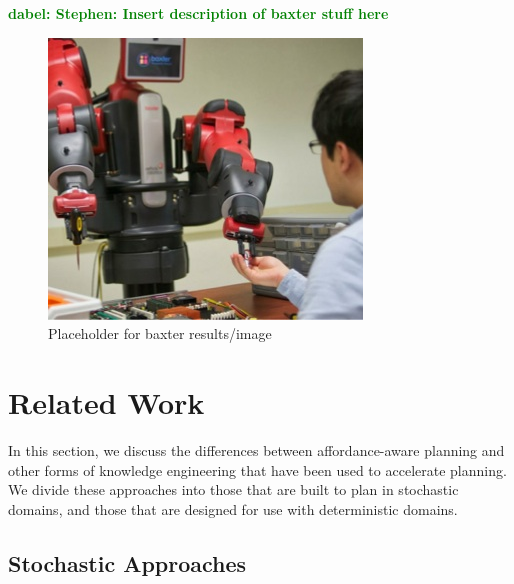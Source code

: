 \documentclass[letterpaper]{article}
\newcommand{\dnote}[1]{\textcolor{Green}{\textbf{dabel:  #1}}}
\begin{document}
\dnote{Stephen: Insert description of baxter stuff here}

\begin{figure}[H]
\centering
\includegraphics[scale=0.195]{figures/baxter_temp.jpg}%
  \caption{Placeholder for baxter results/image}
  \label{fig:baxter_results}
\end{figure}

\section{Related Work}
\label{sec:related-work}

In this section, we discuss the differences between
affordance-aware planning and other forms of knowledge engineering that
have been used to accelerate planning. We divide these approaches
into those that are built to plan in stochastic domains, and those that are
designed for use with deterministic domains.

\subsection{Stochastic Approaches}
\end{document}
